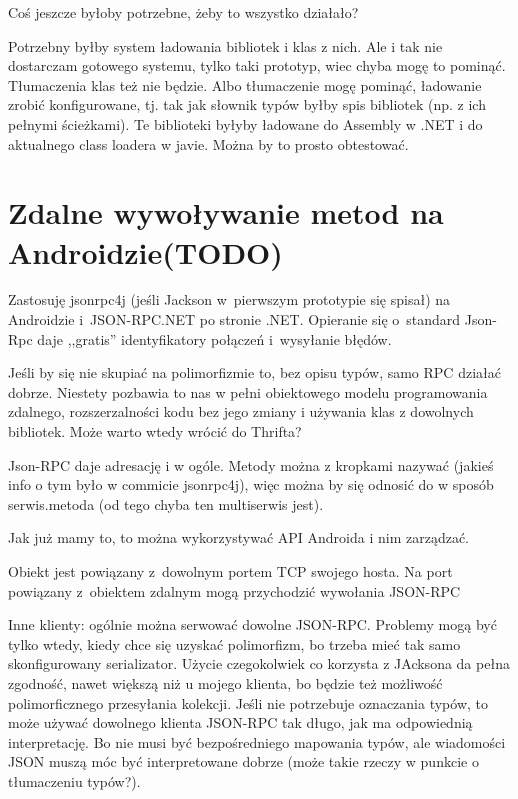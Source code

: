 Coś jeszcze byłoby potrzebne, żeby to wszystko działało?

Potrzebny byłby system ładowania bibliotek i klas z nich. Ale i tak nie dostarczam gotowego systemu, tylko taki prototyp, wiec chyba mogę to pominąć. Tłumaczenia klas też nie będzie. Albo tłumaczenie mogę pominąć, ładowanie zrobić konfigurowane, tj. tak jak słownik typów byłby spis bibliotek (np. z ich pełnymi ścieżkami). Te biblioteki byłyby ładowane do Assembly w .NET i do aktualnego class loadera w javie. Można by to prosto obtestować.



\section{Zdalne wywoływanie metod na Androidzie(TODO)}
\label{android-rpc}
Zastosuję jsonrpc4j (jeśli Jackson w~pierwszym prototypie się spisał) na Androidzie i~JSON-RPC.NET po stronie .NET\@.
Opieranie się o~standard Json-Rpc daje ,,gratis'' identyfikatory połączeń i~wysyłanie błędów.

Jeśli by się nie skupiać na polimorfizmie to, bez opisu typów, samo RPC działać dobrze. Niestety pozbawia to nas w pełni obiektowego modelu programowania zdalnego, rozszerzalności kodu bez jego zmiany i używania klas z dowolnych bibliotek. Może warto wtedy wrócić do Thrifta?

Json-RPC daje adresację i w ogóle. Metody można z kropkami nazywać (jakieś info o tym było w commicie jsonrpc4j), więc można by się odnosić do w sposób serwis.metoda (od tego chyba ten multiserwis jest).

Jak już mamy to, to można wykorzystywać API Androida i nim zarządzać.

Obiekt jest powiązany z~dowolnym portem TCP swojego hosta.
Na port powiązany z~obiektem zdalnym mogą przychodzić wywołania JSON-RPC

Inne klienty: ogólnie można serwować dowolne JSON-RPC. Problemy mogą być tylko wtedy, kiedy chce się uzyskać polimorfizm, bo trzeba mieć tak samo skonfigurowany serializator. Użycie czegokolwiek co korzysta z JAcksona da pełna zgodność, nawet większą niż u mojego klienta, bo będzie też możliwość polimorficznego przesyłania kolekcji. Jeśli nie potrzebuje oznaczania typów, to może używać dowolnego klienta JSON-RPC tak długo, jak ma odpowiednią interpretację. Bo nie musi być bezpośredniego mapowania typów, ale wiadomości JSON muszą móc być interpretowane dobrze (może takie rzeczy w punkcie o tłumaczeniu typów?).

